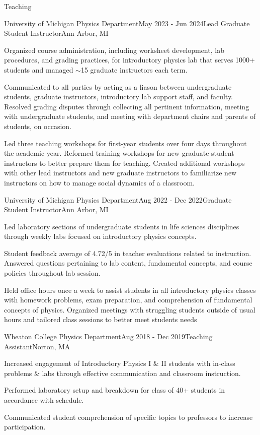 \documentclass{resume} %
\begin{document}
\begin{rSection}{Teaching}

\begin{rSubsection}{University of Michigan Physics Department}{May 2023 - Jun 2024}{Lead Graduate Student Instructor}{Ann Arbor, MI}
    \item Organized course administration, including worksheet development, lab procedures, and grading practices, for introductory physics lab that serves 1000+ students and managed $\sim$15 graduate instructors each term.
    \item Communicated to all parties by acting as a liason between undergraduate students, graduate instructors, introductory lab support staff, and faculty. Resolved grading disputes through collecting all pertinent information, meeting with undergraduate students, and meeting with department chairs and parents of students, on occasion.
    \item Led three teaching workshops for first-year students over four days throughout the academic year. Reformed training workshops for new graduate student instructors to better prepare them for teaching. Created additional workshops with other lead instructors and new graduate instructors to familiarize new instructors on how to manage social dynamics of a classroom. 
\end{rSubsection}

\begin{rSubsection}{University of Michigan Physics Department}{Aug 2022 - Dec 2022}{Graduate Student Instructor}{Ann Arbor, MI}
\item Led laboratory sections of undergraduate students in life sciences disciplines through weekly labs focused on introductory physics concepts. 
\item Student feedback average of 4.72/5 in teacher evaluations related to instruction. Answered questions pertaining to lab content, fundamental concepts, and course policies throughout lab session.
\item Held office hours once a week to assist students in all introductory physics classes with homework problems, exam preparation, and comprehension of fundamental concepts of physics. Organized meetings with struggling students outside of usual hours and tailored class sessions to better meet students needs

\end{rSubsection}

\begin{rSubsection}{Wheaton College Physics Department}{Aug 2018 - Dec 2019}{Teaching Assistant}{Norton, MA}
\item Increased engagement of Introductory Physics I \& II students with in-class problems \& labs through effective communication and classroom instruction.
\item Performed laboratory setup and breakdown for class of 40+ students in accordance with schedule.
\item Communicated student comprehension of specific topics to professors to increase participation.


\end{rSubsection}
\end{rSection}
\end{document}
